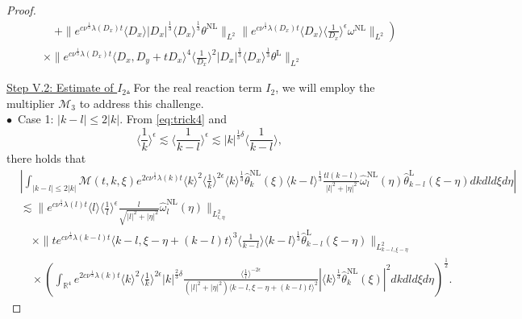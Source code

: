 \documentclass[reqno, 12pt]{amsart} %
\theoremstyle{plain} %
\theoremstyle{definition}
\theoremstyle{remark}
\numberwithin{equation}{section} %
\newcommand{\lt}{\left}
\newcommand{\rt}{\right}
\begin{document}
\begin{proof}
\begin{equation}
\begin{aligned}
				&\lt. \qquad + \|e^{c \nu^{\frac{1}{3}} \lambda\left(D_x\right) t}\langle D_x\rangle\left|D_x\right|^{\frac{1}{3}} \langle D_x \rangle^\frac13  \theta^{\mathrm{NL}}\|_{L^2}\|e^{c \nu^{\frac{1}{3}} \lambda\left(D_x\right) t}\langle D_x\rangle\langle\frac{1}{D_x}\rangle^\epsilon \omega^{\mathrm{NL}}\|_{L^2} \rt) \\
				& \quad \times\|e^{c \nu^{\frac{1}{3}} \lambda\left(D_x\right) t}\langle D_x, D_y+t D_x\rangle^4\langle\frac{1}{D_x}\rangle^2\left|D_x\right|^{\frac{1}{3}} \langle D_x \rangle^\frac13  \theta^{\mathrm{L}}\|_{L^2}
		\end{aligned}\end{equation}
		
	    \underline{ Step V.2: Estimate of $I_2$.}  
		For the real reaction term $I_2$, we will employ the multiplier $\mathcal{M}_3$ to address this challenge. \\
		$\bullet$~Case 1:   $|k-l| \leq 2|k|$.  From \eqref{eq:trick4} and $$\langle\frac{1}{k}\rangle^\epsilon \lesssim\langle\frac{1}{k-l}\rangle^\epsilon  \lesssim |k|^{\frac13 \delta} \langle \frac{1}{k-l} \rangle,$$ there holds that
		\small{	\begin{equation}\begin{aligned} \label{eq:im}
					& \left|\int_{|k-l| \leq 2|k|}  \mathcal{M}(t, k, \xi) e^{2 c \nu^{\frac{1}{3}} \lambda(k) t}\langle k\rangle^2\langle\frac{1}{k}\rangle^{2 \epsilon} \langle k \rangle^\frac13\hat{\theta}_k^{\mathrm{NL}}(\xi) \langle k-l \rangle^\frac13  \frac{t l(k-l)}{|l|^2+|\eta|^2} \hat{\omega}_l^{\mathrm{NL}}(\eta) \hat{\theta}_{k-l}^{\mathrm{L}}(\xi-\eta)   d k d l d \xi d \eta\right| \\
					& \lesssim\|e^{c \nu^{\frac{1}{3}} \lambda(l) t}\langle l\rangle\langle\frac{1}{l}\rangle^\epsilon \frac{l}{\sqrt{|l|^2+|\eta|^2}} \hat{\omega}_l^{\mathrm{NL}}(\eta)\|_{L_{l, \eta}^2} \\
					& \quad \times\|t e^{c \nu^{\frac{1}{3}} \lambda(k-l) t}\langle k-l, \xi-\eta+(k-l) t\rangle^3\langle\frac{1}{k-l}\rangle  \langle k-l \rangle^\frac13 \hat{\theta}_{k-l}^{\mathrm{L}}(\xi-\eta)\|_{L_{k-l, \xi-\eta}^2} \\
					& \quad \times\left(\int_{\mathbb{R}^4} e^{2 c \nu^{\frac{1}{3}} \lambda(k) t}\langle k\rangle^2\langle\frac{1}{k}\rangle^{2 \epsilon}|k |^{\frac{2}{3}\delta}  \frac{\langle\frac{1}{l}\rangle^{-2 \epsilon}}{\left(|l|^2+|\eta|^2\right)\langle k-l, \xi-\eta+(k-l) t\rangle^2}\left|\langle k \rangle^\frac13 \hat{\theta}_k^{\mathrm{NL}}(\xi)\right|^2 d k d l d \xi d \eta\right)^{\frac{1}{2}} .

\end{aligned}
\end{equation}}
\end{proof}
\end{document}
